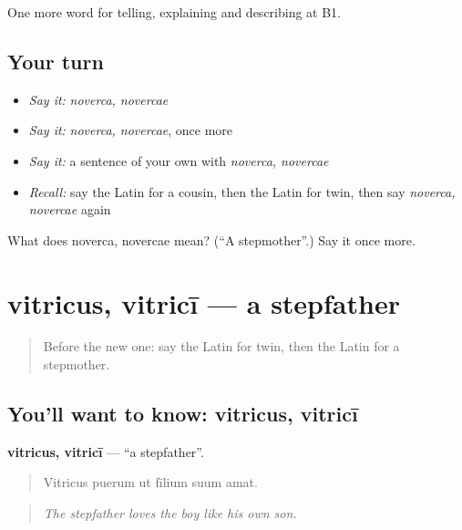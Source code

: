 \begin{grammarlens}[title={What you've built}]
One more word for telling, explaining and describing at B1.
\end{grammarlens}

\subsection*{Your turn}
\begin{itemize}
\raggedright
  \item \emph{Say it:} \emph{noverca, novercae}
  \item \emph{Say it:} \emph{noverca, novercae}, once more
  \item \emph{Say it:} a sentence of your own with \emph{noverca, novercae}
  \item \emph{Recall:} say the Latin for a cousin, then the Latin for twin, then say \emph{noverca, novercae} again
\end{itemize}

\begin{tcolorbox}[breakable,colback=teal!4,colframe=teal!35!black,title={Before you move on}]
What does noverca, novercae mean? (\textquotedblleft{}A stepmother\textquotedblright{}.) Say it once more.
\end{tcolorbox}
\section[vitricus, vitricī]{vitricus, vitricī — a stepfather}

\label{lesson:LA-C529-vitricus}



\begin{quote}
Before the new one: say the Latin for twin, then the Latin for a stepmother.
\end{quote}

\subsection*{You'll want to know: vitricus, vitricī}
\textbf{vitricus, vitricī} — \textquotedblleft{}a stepfather\textquotedblright{}.

\begin{quote}
Vitricus puerum ut fīlium suum amat.
\end{quote}

\begin{quote}
\emph{The stepfather loves the boy like his own son.}
\end{quote}

